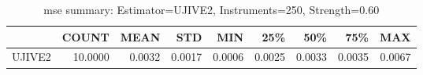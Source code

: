 \begin{table}[ht]
\centering
\caption{mse summary: Estimator=UJIVE2, Instruments=250, Strength=0.60}
\begin{tabular}{lrrrrrrrr}
\toprule
 & COUNT & MEAN & STD & MIN & 25\% & 50\% & 75\% & MAX \\
\midrule
UJIVE2 & 10.0000 & 0.0032 & 0.0017 & 0.0006 & 0.0025 & 0.0033 & 0.0035 & 0.0067 \\
\bottomrule
\end{tabular}
\end{table}
